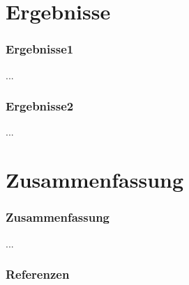 \documentclass[student, noshadow, lsr, aspectratio=169]{ITR_LSR_slides}
\begin{document}
\section{Ergebnisse}

\begin{frame}
	\frametitle{Ergebnisse1}
	...
\end{frame}

\begin{frame}
	\frametitle{Ergebnisse2}
	...
\end{frame}



{
    \begin{frame}[plain]
    \end{frame}
}


\section{Zusammenfassung}

\begin{frame}
	\frametitle{Zusammenfassung}
	...
\end{frame}
\appendix
\begin{frame}
	\frametitle{Referenzen}
	\printbibliography
\end{frame}
\end{document}
